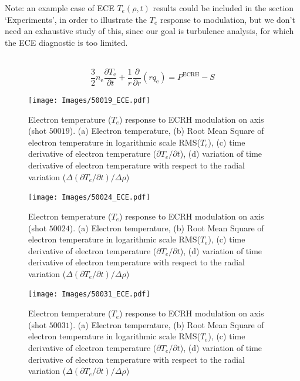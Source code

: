 \documentclass[preprint,12pt,authoryear]{elsarticle}
\begin{document}
Note: an example case of ECE $T_e(\rho,t)$ results could be included in the section `Experiments', in order to illustrate the $T_e$ response to modulation, but we don't need an exhaustive study of this, since our goal is turbulence analysis, for which the ECE diagnostic is too limited.

~\protect\cite{S_Eguilior_2003}
\begin{equation}
    \frac{3}{2}n_\mathrm{e}\frac{\partial T_\mathrm{e}}{\partial t} + \frac{1}{r}\frac{\partial }{\partial r}(r q_\mathrm{e}) = P^\mathrm{ECRH} - S
    \label{Eq.Transport_1}
\end{equation}

\begin{figure}[!ht]
   \texttt{[image: Images/50019\_ECE.pdf]}
   \caption{Electron temperature ($T_e$) response to ECRH modulation on axis (shot $50019$). (a) Electron temperature, (b) Root Mean Square of electron temperature in logarithmic scale RMS($T_e$), (c) time derivative of electron temperature ($\partial T_e /\partial t $), (d) variation of time derivative of electron temperature with respect to the radial variation ($\Delta(\partial T_e /\partial t)/\Delta \rho $)}
   \label{Fig:50019_ECE}
\end{figure}

\begin{figure}[!ht]

   \texttt{[image: Images/50024\_ECE.pdf]}
   \caption{Electron temperature ($T_e$) response to ECRH modulation on axis (shot $50024$). (a) Electron temperature, (b) Root Mean Square of electron temperature in logarithmic scale RMS($T_e$), (c) time derivative of electron temperature ($\partial T_e /\partial t $), (d) variation of time derivative of electron temperature with respect to the radial variation ($\Delta(\partial T_e /\partial t)/\Delta \rho $)}
   \label{Fig:50024_ECE}
\end{figure}

\begin{figure}[!ht]
   \texttt{[image: Images/50031\_ECE.pdf]}
   \caption{Electron temperature ($T_e$) response to ECRH modulation on axis (shot $50031$). (a) Electron temperature, (b) Root Mean Square of electron temperature in logarithmic scale RMS($T_e$), (c) time derivative of electron temperature ($\partial T_e /\partial t $), (d) variation of time derivative of electron temperature with respect to the radial variation ($\Delta(\partial T_e /\partial t)/\Delta \rho $)}
   \label{Fig:50031_ECE}
\end{figure}
\end{document}
